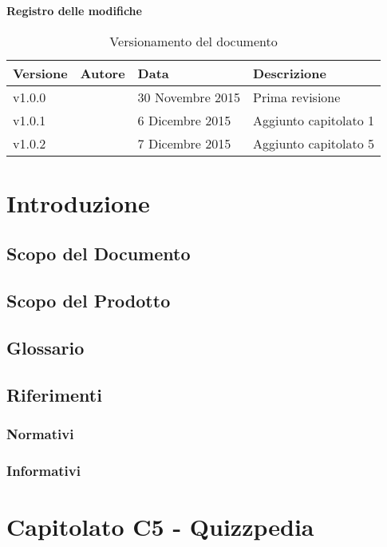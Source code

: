 \documentclass[12pt,a4paper]{article}
\begin{document}
\Large{\textbf{Registro delle modifiche}}\\
\normalsize

\begin{table}[h]
\begin{center}

\begin{tabular}{p{} p{} p{} p{}}
\toprule
\textbf{Versione}	&	\textbf{Autore}	&	\textbf{Data}	&	\textbf{Descrizione}\\
\midrule
\midrule
v1.0.0	&	\NDC	&	30 Novembre 2015 	&	Prima revisione\\
\midrule
v1.0.1	&	\TP	&	6 Dicembre 2015	&	Aggiunto capitolato 1\\
\midrule
v1.0.2	&	\TP	&	7 Dicembre 2015	&	Aggiunto capitolato 5\\
\bottomrule
\end{tabular}
\caption{Versionamento del documento}
\label{tabVers1}
\end{center}
\end{table}
\newpage

\tableofcontents
\newpage

\section{Introduzione}
\subsection{Scopo del Documento}
\subsection{Scopo del Prodotto}
\subsection{Glossario}
\subsection{Riferimenti}
\subsubsection{Normativi}
\subsubsection{Informativi}

\newpage
\section{Capitolato C5 - Quizzpedia}
\end{document}
